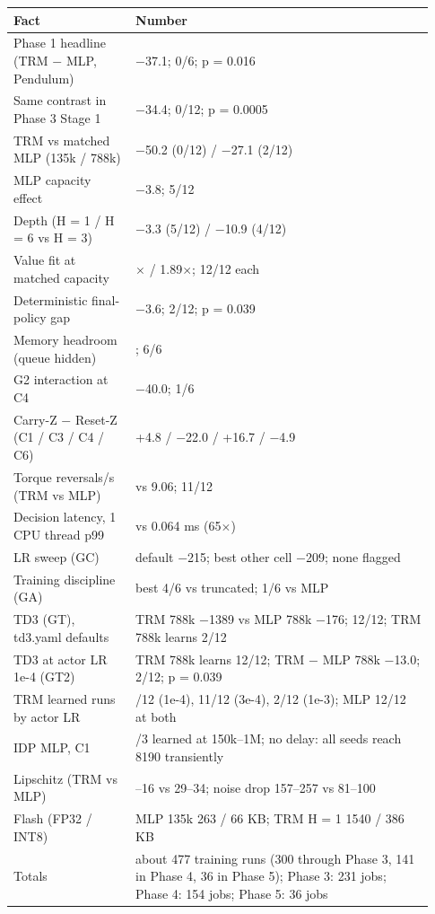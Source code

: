 \documentclass[11pt]{article}
\begin{document}
\begin{center}\small\begin{tabular}{>{\raggedright\arraybackslash}p{0.270\linewidth}>{\raggedright\arraybackslash}p{0.664\linewidth}}
\toprule
Fact & Number \\
\midrule
Phase 1 headline (TRM $-$ MLP, Pendulum) & $-$37.1; 0/6; p = 0.016 \\
Same contrast in Phase 3 Stage 1 & $-$34.4; 0/12; p = 0.0005 \\
TRM vs matched MLP (135k / 788k) & $-$50.2 (0/12) / $-$27.1 (2/12) \\
MLP capacity effect & $-$3.8; 5/12 \\
Depth (H = 1 / H = 6 vs H = 3) & $-$3.3 (5/12) / $-$10.9 (4/12) \\
Value fit at matched capacity & 1.45$\times$ / 1.89$\times$; 12/12 each \\
Deterministic final-policy gap & $-$3.6; 2/12; p = 0.039 \\
Memory headroom (queue hidden) & 70.8; 6/6 \\
G2 interaction at C4 & $-$40.0; 1/6 \\
Carry-Z $-$ Reset-Z (C1 / C3 / C4 / C6) & +4.8 / $-$22.0 / +16.7 / $-$4.9 \\
Torque reversals/s (TRM vs MLP) & 0.38 vs 9.06; 11/12 \\
Decision latency, 1 CPU thread p99 & 4.13 vs 0.064 ms (65$\times$) \\
LR sweep (GC) & default $-$215; best other cell $-$209; none flagged \\
Training discipline (GA) & best 4/6 vs truncated; 1/6 vs MLP \\
TD3 (GT), td3.yaml defaults & TRM 788k $-$1389 vs MLP 788k $-$176; 12/12; TRM 788k learns 2/12 \\
TD3 at actor LR 1e-4 (GT2) & TRM 788k learns 12/12; TRM $-$ MLP 788k $-$13.0; 2/12; p = 0.039 \\
TRM learned runs by actor LR & 12/12 (1e-4), 11/12 (3e-4), 2/12 (1e-3); MLP 12/12 at both \\
IDP MLP, C1 & 0/3 learned at 150k--1M; no delay: all seeds reach 8190 transiently \\
Lipschitz (TRM vs MLP) & 11--16 vs 29--34; noise drop 157--257 vs 81--100 \\
Flash (FP32 / INT8) & MLP 135k 263 / 66 KB; TRM H = 1 1540 / 386 KB \\
Totals & about 477 training runs (300 through Phase 3, 141 in Phase 4, 36 in Phase 5); Phase 3: 231 jobs; Phase 4: 154 jobs; Phase 5: 36 jobs \\
\bottomrule
\end{tabular}\end{center}
\end{document}
